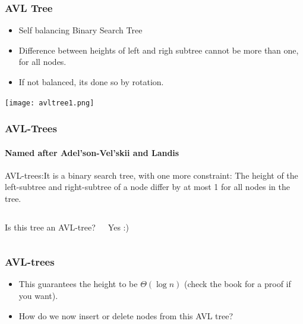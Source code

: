\begin{frame}
	\frametitle{AVL Tree}
		\begin{itemize}
		\item Self balancing Binary Search Tree
		\item Difference between heights of left and righ subtree cannot be more than one, for all nodes.
		\item If not balanced, its done so by rotation.
		\end{itemize}
		
\begin{center}
\texttt{[image: avltree1.png]}
\end{center}

\end{frame}


\begin{frame}
	\frametitle{AVL-Trees}
	\framesubtitle{Named after Adel'son-Vel'skii and Landis}

AVL-trees:It is a binary search tree, with one more constraint:
			The height of the left-subtree and right-subtree of a node differ by at most 1 for all nodes in the tree.

	\begin{columns}[T]


			Is this tree an AVL-tree?
		
			Yes :)	
	\end{columns}
\end{frame}

\begin{frame}
	\frametitle{AVL-trees}
		\begin{itemize}
			\item This guarantees the height to be $\Theta(\log n)$ (check the book for a proof if you want).
			\item How do we now insert or delete nodes from this AVL tree?
	\end{itemize}
\end{frame}

